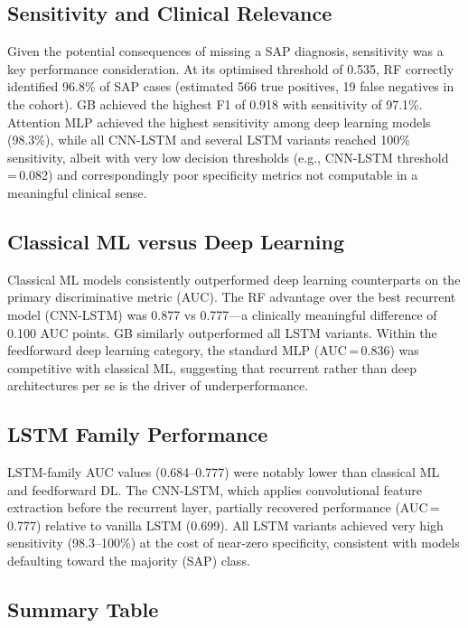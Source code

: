 \documentclass[12pt,a4paper]{article}
\begin{document}
\subsection{Sensitivity and Clinical Relevance}

Given the potential consequences of missing a SAP diagnosis, sensitivity was a key performance consideration. At its optimised threshold of 0.535, RF correctly identified 96.8\% of SAP cases (estimated 566 true positives, 19 false negatives in the cohort). GB achieved the highest F1 of 0.918 with sensitivity of 97.1\%. Attention MLP achieved the highest sensitivity among deep learning models (98.3\%), while all CNN-LSTM and several LSTM variants reached 100\% sensitivity, albeit with very low decision thresholds (e.g., CNN-LSTM threshold\,=\,0.082) and correspondingly poor specificity metrics not computable in a meaningful clinical sense.

\subsection{Classical ML versus Deep Learning}

Classical ML models consistently outperformed deep learning counterparts on the primary discriminative metric (AUC). The RF advantage over the best recurrent model (CNN-LSTM) was 0.877 vs 0.777—a clinically meaningful difference of 0.100 AUC points. GB similarly outperformed all LSTM variants. Within the feedforward deep learning category, the standard MLP (AUC\,=\,0.836) was competitive with classical ML, suggesting that recurrent rather than deep architectures per se is the driver of underperformance.

\subsection{LSTM Family Performance}

LSTM-family AUC values (0.684--0.777) were notably lower than classical ML and feedforward DL. The CNN-LSTM, which applies convolutional feature extraction before the recurrent layer, partially recovered performance (AUC\,=\,0.777) relative to vanilla LSTM (0.699). All LSTM variants achieved very high sensitivity (98.3--100\%) at the cost of near-zero specificity, consistent with models defaulting toward the majority (SAP) class.

\subsection{Summary Table}
\end{document}
